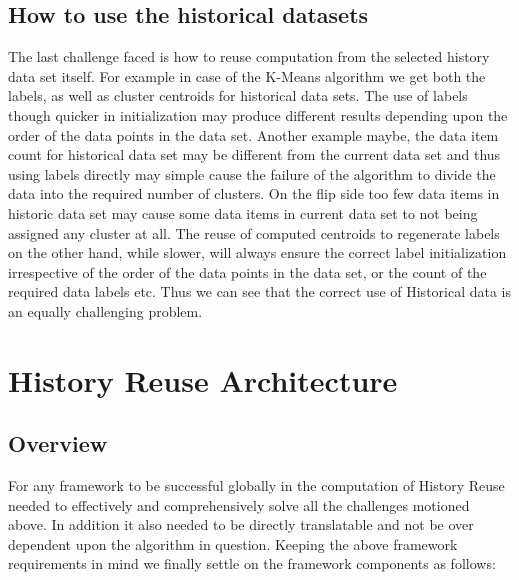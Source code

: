 \documentclass{vldb}
\begin{document}
\subsection{How to use the historical datasets}
The last challenge faced is how to reuse computation from the selected history data set itself. For example in case of the K-Means algorithm we get both the labels, as well as cluster centroids for historical data sets. The use of labels though quicker in initialization may produce different results depending upon the order of the data points in the data set.  Another example maybe, the data item count for historical data set may be different from the current data set and thus using labels directly may simple cause the failure of the algorithm to divide the data into the required number of clusters. On the flip side too few data items in historic data set may cause some data items in current data set to not being assigned any cluster at all. The reuse of computed centroids to regenerate labels on the other hand, while slower, will always ensure the correct label initialization irrespective of the order of the data points in the data set, or the count of the required data labels etc.
Thus we can see that the correct use of Historical data is an equally challenging problem.

\section{History Reuse Architecture}
\label{chap-four}
\subsection{Overview}
\label{overview}
For any framework to be successful globally in the computation of History Reuse needed to effectively and comprehensively solve all the challenges motioned above. In addition it also needed to be directly translatable and not be over dependent upon the algorithm in question. Keeping the above framework requirements in mind we finally settle on the framework components as follows:
\end{document}
